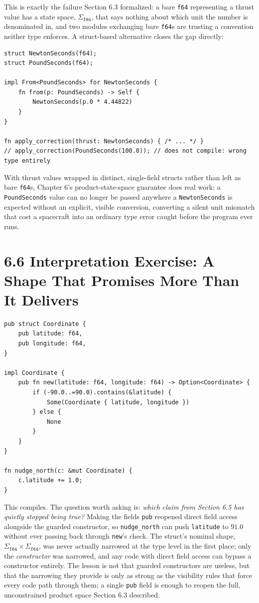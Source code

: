 \documentclass[11pt]{book}
\begin{document}
This is exactly the failure Section 6.3 formalized: a bare \texttt{f64} representing a thrust value has a state space, $\Sigma_{\texttt{f64}}$, that says nothing about which unit the number is denominated in, and two modules exchanging bare \texttt{f64}s are trusting a convention neither type enforces. A struct-based alternative closes the gap directly:

\begin{lstlisting}
struct NewtonSeconds(f64);
struct PoundSeconds(f64);

impl From<PoundSeconds> for NewtonSeconds {
    fn from(p: PoundSeconds) -> Self {
        NewtonSeconds(p.0 * 4.44822)
    }
}

fn apply_correction(thrust: NewtonSeconds) { /* ... */ }
// apply_correction(PoundSeconds(100.0)); // does not compile: wrong type entirely
\end{lstlisting}

With thrust values wrapped in distinct, single-field structs rather than left as bare \texttt{f64}s, Chapter 6's product-state-space guarantee does real work: a \texttt{PoundSeconds} value can no longer be passed anywhere a \texttt{NewtonSeconds} is expected without an explicit, visible conversion, converting a silent unit mismatch that cost a spacecraft into an ordinary type error caught before the program ever runs.

\section*{6.6 Interpretation Exercise: A Shape That Promises More Than It Delivers}

\begin{lstlisting}
pub struct Coordinate {
    pub latitude: f64,
    pub longitude: f64,
}

impl Coordinate {
    pub fn new(latitude: f64, longitude: f64) -> Option<Coordinate> {
        if (-90.0..=90.0).contains(&latitude) {
            Some(Coordinate { latitude, longitude })
        } else {
            None
        }
    }
}

fn nudge_north(c: &mut Coordinate) {
    c.latitude += 1.0;
}
\end{lstlisting}

This compiles. The question worth asking is: \emph{which claim from Section 6.5 has quietly stopped being true?} Making the fields \texttt{pub} reopened direct field access alongside the guarded constructor, so \texttt{nudge\_north} can push \texttt{latitude} to $91.0$ without ever passing back through \texttt{new}'s check. The struct's nominal shape, $\Sigma_{\texttt{f64}} \times \Sigma_{\texttt{f64}}$, was never actually narrowed at the type level in the first place; only the \emph{constructor} was narrowed, and any code with direct field access can bypass a constructor entirely. The lesson is not that guarded constructors are useless, but that the narrowing they provide is only as strong as the visibility rules that force every code path through them; a single \texttt{pub} field is enough to reopen the full, unconstrained product space Section 6.3 described.
\end{document}
